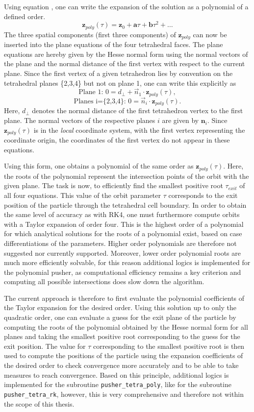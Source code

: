 \documentclass[./main.tex]{subfiles}
\begin{document}
Using equation , one can write the expansion of the solution as a polynomial of a defined order.
$$\textbf{z}_{poly}(\tau) = \textbf{z}_0 + \textbf{a}\tau + \textbf{b}\tau^2 + \dots$$
The three spatial components (first three components) of $\textbf{z}_{poly}$ can now be inserted into the plane equations of the four tetrahedral faces. The plane equations are hereby given by the Hesse normal form using the normal vectors of the plane and the normal distance of the first vertex with respect to the current plane. Since the first vertex of a given tetrahedron lies by convention on the tetrahedral planes \{2,3,4\} but not on plane 1, one can write this explicitly as
$$\text{Plane 1: } 0 = d_\perp + \vec{n}_1\cdot\textbf{z}_{poly}(\tau),$$
$$\text{Planes i=\{2,3,4\}: } 0 = \vec{n}_i\cdot\textbf{z}_{poly}(\tau).$$
Here, $d_\perp$ denotes the normal distance of the first tetrahedron vertex to the first plane. The normal vectors of the respective planes $i$ are given by $\textbf{n}_i$. Since $\textbf{z}_{poly}(\tau)$ is in the \textit{local} coordinate system, with the first vertex representing the coordinate origin, the coordinates of the first vertex do not appear in these equations.

Using this form, one obtains a polynomial of the same order as $\textbf{z}_{poly}(\tau)$. Here, the roots of the polynomial represent the intersection points of the orbit with the given plane. The task is now, to efficiently find the smallest positive root $\tau_{exit}$ of all four equations. This value of the orbit parameter $\tau$ corresponds to the exit position of the particle through the tetrahedral cell boundary. In order to obtain the same level of accuracy as with RK4, one must furthermore compute orbits with a Taylor expansion of order four. This is the highest order of a polynomial for which analytical solutions for the roots of a polynomial exist, based on case differentiations of the parameters. Higher order polynomials are therefore not suggested nor currently supported. Moreover, lower order polynomial roots are much more efficiently solvable, for this reason additional logics is implemented for the polynomial pusher, as computational efficiency remains a key criterion and computing all possible intersections does slow down the algorithm. 

The current approach is therefore to first evaluate the polynomial coefficients of the Taylor expansion for the desired order. Using this solution up to only the quadratic order, one can evaluate a guess for the exit plane of the particle by computing the roots of the polynomial obtained by the Hesse normal form for all planes and taking the smallest positive root corresponding to the guess for the exit position. The value for $\tau$ corresponding to the smallest positive root is then used to compute the positions of the particle using the expansion coefficients of the desired order to check convergence more accurately and to be able to take measures to reach convergence. Based on this principle, additional logics is implemented for the subroutine \texttt{pusher\_tetra\_poly}, like for the subroutine \texttt{pusher\_tetra\_rk}, however, this is very comprehensive and therefore not within the scope of this thesis.
\end{document}
